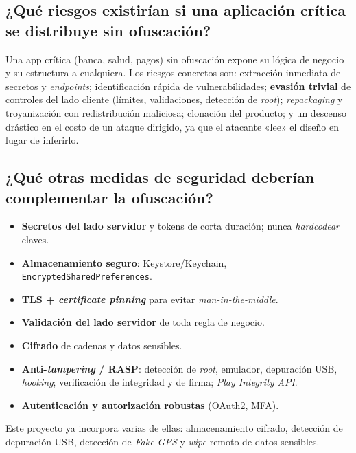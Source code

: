 \documentclass[12pt,letterpaper]{article}
\begin{document}
\subsection*{¿Qué riesgos existirían si una aplicación crítica se distribuye sin ofuscación?}
Una app crítica (banca, salud, pagos) sin ofuscación expone su lógica de negocio
y su estructura a cualquiera. Los riesgos concretos son: extracción inmediata de
secretos y \emph{endpoints}; identificación rápida de vulnerabilidades;
\textbf{evasión trivial} de controles del lado cliente (límites, validaciones,
detección de \emph{root}); \emph{repackaging} y troyanización con redistribución
maliciosa; clonación del producto; y un descenso drástico en el costo de un
ataque dirigido, ya que el atacante «lee» el diseño en lugar de inferirlo.

\subsection*{¿Qué otras medidas de seguridad deberían complementar la ofuscación?}
\begin{itemize}[leftmargin=1.4em]
  \item \textbf{Secretos del lado servidor} y tokens de corta duración; nunca
        \emph{hardcodear} claves.
  \item \textbf{Almacenamiento seguro}: Keystore/Keychain,
        \texttt{EncryptedSharedPreferences}.
  \item \textbf{TLS + \emph{certificate pinning}} para evitar
        \emph{man-in-the-middle}.
  \item \textbf{Validación del lado servidor} de toda regla de negocio.
  \item \textbf{Cifrado} de cadenas y datos sensibles.
  \item \textbf{Anti-\emph{tampering} / RASP}: detección de \emph{root},
        emulador, depuración USB, \emph{hooking}; verificación de integridad y
        de firma; \emph{Play Integrity API}.
  \item \textbf{Autenticación y autorización robustas} (OAuth2, MFA).
\end{itemize}
Este proyecto ya incorpora varias de ellas: almacenamiento cifrado, detección de
depuración USB, detección de \emph{Fake GPS} y \emph{wipe} remoto de datos
sensibles.
\end{document}

